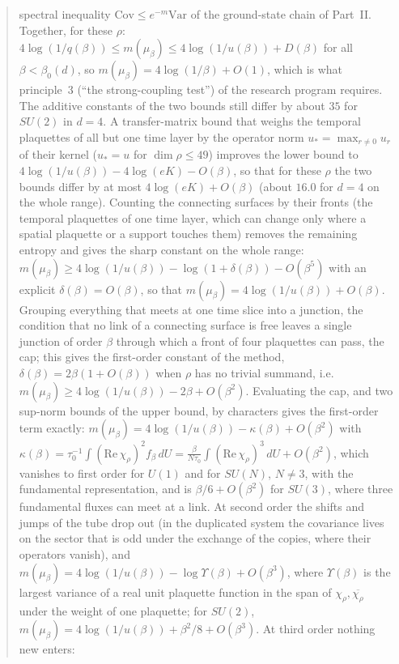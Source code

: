\documentclass[11pt,a4paper]{article}
\theoremstyle{definition}
\theoremstyle{remark}
\newcommand{\dU}{\,dU}
\begin{document}
\begin{abstract}
spectral inequality $\mathrm{Cov}\le e^{-m}\mathrm{Var}$ of the ground-state chain of Part~II. Together, for these $\rho$:
$4\log(1/q(\beta))\le m(\mu_\beta)\le4\log(1/u(\beta))+D(\beta)$ for all $\beta<\beta_0(d)$, so $m(\mu_\beta)=4\log(1/\beta)+O(1)$, which is
what principle~3 (``the strong-coupling test'') of the research program requires. The additive constants of the two bounds still
differ by about $35$ for $SU(2)$ in $d=4$. A transfer-matrix bound that weighs the temporal plaquettes of all but one time layer by the
operator norm $u_*=\max_{r\neq0}u_r$ of their kernel ($u_*=u$ for $\dim\rho\le49$) improves the lower bound to
$4\log(1/u(\beta))-4\log(eK)-O(\beta)$, so that for these $\rho$ the two bounds differ by at most $4\log(eK)+O(\beta)$ (about $16.0$ for $d=4$ on
the whole range). Counting the connecting surfaces by their fronts (the temporal plaquettes of one time layer, which can change only where a spatial
plaquette or a support touches them) removes the remaining entropy and gives the sharp constant on the whole range:
$m(\mu_\beta)\ge4\log(1/u(\beta))-\log(1+\delta(\beta))-O(\beta^5)$ with an explicit $\delta(\beta)=O(\beta)$, so that $m(\mu_\beta)=4\log(1/u(\beta))+O(\beta)$.
Grouping everything that meets at one time slice into a junction, the condition that no link of a connecting surface is free leaves a single
junction of order $\beta$ through which a front of four plaquettes can pass, the cap; this gives the first-order constant of the method,
$\delta(\beta)=2\beta(1+O(\beta))$ when $\rho$ has no trivial summand, i.e.\ $m(\mu_\beta)\ge4\log(1/u(\beta))-2\beta+O(\beta^2)$. Evaluating the cap, and two sup-norm
bounds of the upper bound, by characters gives the first-order term exactly: $m(\mu_\beta)=4\log(1/u(\beta))-\kappa(\beta)+O(\beta^2)$ with
$\kappa(\beta)=\tau_0^{-1}\int(\mathrm{Re}\,\chi_\rho)^2f_\beta\dU=\frac\beta{N\tau_0}\int(\mathrm{Re}\,\chi_\rho)^3\dU+O(\beta^2)$, which vanishes to first order
for $U(1)$ and for $SU(N)$, $N\ne3$, with the fundamental representation, and is $\beta/6+O(\beta^2)$ for $SU(3)$, where three fundamental fluxes
can meet at a link. At second order the shifts and jumps of the tube drop out (in the duplicated system the covariance lives on the sector that is odd
under the exchange of the copies, where their operators vanish), and $m(\mu_\beta)=4\log(1/u(\beta))-\log\Upsilon(\beta)+O(\beta^3)$, where $\Upsilon(\beta)$
is the largest variance of a real unit plaquette function in the span of $\chi_\rho,\overline{\chi_\rho}$ under the weight of one plaquette; for $SU(2)$,
$m(\mu_\beta)=4\log(1/u(\beta))+\beta^2/8+O(\beta^3)$. At third order nothing new enters:

\end{abstract}
\end{document}

